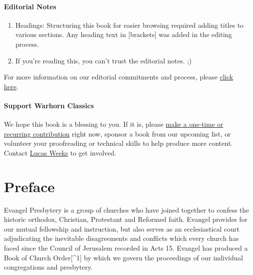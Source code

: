 \documentclass[
]{book}
\providecommand{\tightlist}{%
  \setlength{\itemsep}{0pt}\setlength{\parskip}{0pt}}
\begin{document}
\hypertarget{editorial-notes}{%
\subsubsection*{Editorial Notes}\label{editorial-notes}}

\begin{enumerate}
\def\labelenumi{\arabic{enumi}.}
\tightlist
\item
  Headings: Structuring this book for easier browsing required adding titles to various sections. Any heading text in {[}brackets{]} was added in the editing process.
\item
  If you're reading this, you can't trust the editorial notes. ;)
\end{enumerate}

For more information on our editorial commitments and process, please \href{https://classics.warhornmedia.com/editorial}{click here}.

\hypertarget{support-warhorn-classics}{%
\subsubsection*{Support Warhorn Classics}\label{support-warhorn-classics}}

We hope this book is a blessing to you. If it is, please \href{https://warhornmedia.com/give}{make a one-time or recurring contribution} right now, sponsor a book from our upcoming list, or volunteer your proofreading or technical skills to help produce more content. Contact \href{mailto:lucas@beggarsborn.com}{Lucas Weeks} to get involved.

\clearpage
\setcounter{page}{1}

\hypertarget{preface}{%
\chapter{Preface}\label{preface}}

Evangel Presbytery is a group of churches who have joined together to confess the historic orthodox, Christian, Protestant and Reformed faith. Evangel provides for our mutual fellowship and instruction, but also serves as an ecclesiastical court adjudicating the inevitable disagreements and conflicts which every church has faced since the Council of Jerusalem recorded in Acts 15. Evangel has produced a Book of Church Order{[}\^{}1{]} by which we govern the proceedings of our individual congregations and presbytery.
\end{document}
